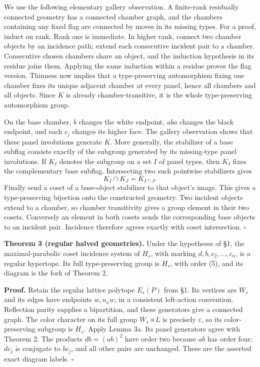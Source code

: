 We use the following elementary gallery observation. A finite-rank residually connected geometry has a connected chamber graph, and the chambers containing any fixed flag are connected by moves in its missing types. For a proof, induct on rank. Rank one is immediate. In higher rank, connect two chamber objects by an incidence path; extend each consecutive incident pair to a chamber. Consecutive chosen chambers share an object, and the induction hypothesis in its residue joins them. Applying the same induction within a residue proves the flag version. Thinness now implies that a type-preserving automorphism fixing one chamber fixes its unique adjacent chamber at every panel, hence all chambers and all objects. Since $K$ is already chamber-transitive, it is the whole type-preserving automorphism group.

On the base chamber, $b$ changes the white endpoint, $aba$ changes the black endpoint, and each $c_j$ changes its higher face. The gallery observation shows that these panel involutions generate $K$. More generally, the stabilizer of a base subflag consists exactly of the subgroup generated by its missing-type panel involutions. If $K_I$ denotes the subgroup on a set $I$ of panel types, then $K_I$ fixes the complementary base subflag. Intersecting two such pointwise stabilizers gives
\[
K_I\cap K_J=K_{I\cap J}.
\]
Finally send a coset of a base-object stabilizer to that object's image. This gives a type-preserving bijection onto the constructed geometry. Two incident objects extend to a chamber, so chamber transitivity gives a group element in their two cosets. Conversely an element in both cosets sends the corresponding base objects to an incident pair. Incidence therefore agrees exactly with coset intersection. $\square$

\textbf{Theorem 3 (regular halved geometries).} Under the hypotheses of \S1, the maximal-parabolic coset incidence system of $H_s$, with marking $d,b,c_2,\ldots,c_n$, is a regular hypertope. Its full type-preserving group is $H_s$, with order (5), and its diagram is the fork of Theorem 2.

\textbf{Proof.}
Retain the regular lattice polytope $E_s(P)$ from \S1. Its vertices are $W_s$ and its edges have endpoints $w,u_xw$, in a consistent left-action convention. Reflection parity supplies a bipartition, and these generators give a connected graph. The color character on its full group $W_s\rtimes L$ is precisely $\varepsilon$, so its color-preserving subgroup is $H_s$. Apply Lemma 3a. Its panel generators agree with Theorem 2. The products $db=(ab)^2$ have order two because $ab$ has order four; $dc_j$ is conjugate to $bc_j$, and all other pairs are unchanged. These are the asserted exact diagram labels. $\square$


